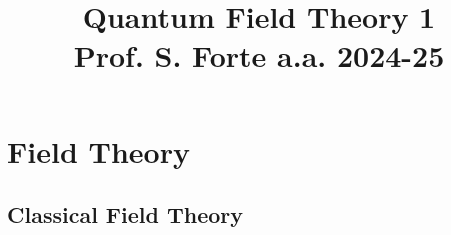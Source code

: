 \documentclass[a4paper, 12pt, openany]{book}
\title{\Huge\textbf{Quantum Field Theory 1} \\ \large Prof. S. Forte a.a. 2024-25}
\begin{document}
\frontmatter

\maketitle
\tableofcontents

\mainmatter

\part{Field Theory}
\pagestyle{body}

\chapter{Classical Field Theory}

\end{document}
